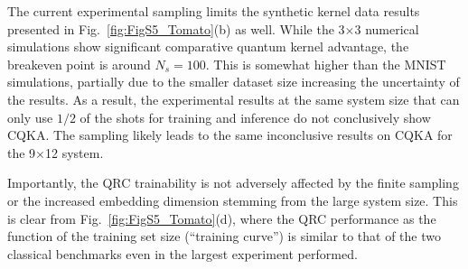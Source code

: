 \documentclass[english,floatfix,twocolumn,showpacs, aps, prx, reprint, superscriptaddress, longbibliography]{revtex4-2}
\begin{document}
The current experimental sampling limits the synthetic kernel data results presented in Fig.~\ref{fig:FigS5_Tomato}(b) as well. While the 3$\times$3 numerical simulations show significant comparative quantum kernel advantage, the breakeven point is around $N_s=100$. This is somewhat higher than the MNIST simulations, partially due to the smaller dataset size increasing the uncertainty of the results. As a result, the experimental results at the same system size that can only use $1/2$ of the shots for training and inference do not conclusively show CQKA. The sampling likely leads to the same inconclusive results on CQKA for the 9$\times$12 system.

Importantly, the QRC trainability is not adversely affected by the finite sampling or the increased embedding dimension stemming from the large system size. This is clear from Fig.~\ref{fig:FigS5_Tomato}(d), where the QRC performance as the function of the training set size (``training curve'') is similar to that of the two classical benchmarks even in the largest experiment performed.

\end{document}
